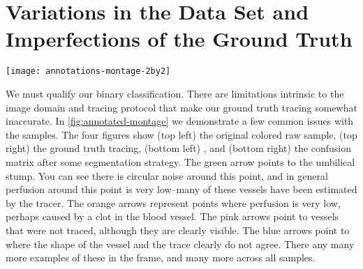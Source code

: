 

\section{Variations in the Data Set and Imperfections of the Ground Truth} \label{sec:NCS-dataset-issues}
\begin{sidewaysfigure}
	\texttt{[image: annotations-montage-2by2]}
	\caption{Issues with the ground truth manifesting in Frangi vesselness scores}
	\label{fig:annotated-montage}
\end{sidewaysfigure}

We must qualify our binary classification. There are limitations intrinsic to the image domain and tracing protocol that make our ground truth tracing somewhat inaccurate. In \cref{fig:annotated-montage} we demonstrate a few common issues with the samples. The four figures show (top left) the original colored raw sample, (top right) the ground truth tracing, (bottom left) \Vmax, and (bottom right) the confusion matrix after some segmentation strategy. %
The green arrow points to the umbilical stump. You can see there is circular noise around this point, and in general perfusion around this point is very low--many of these vessels have been estimated by the tracer. The orange arrows represent points where perfusion is very low, perhaps caused by a clot in the blood vessel. The pink arrows point to vessels that were not traced, although they are clearly visible. The blue arrows point to where the shape of the vessel and the trace clearly do not agree. There any many more examples of these in the frame, and many more across all samples.


